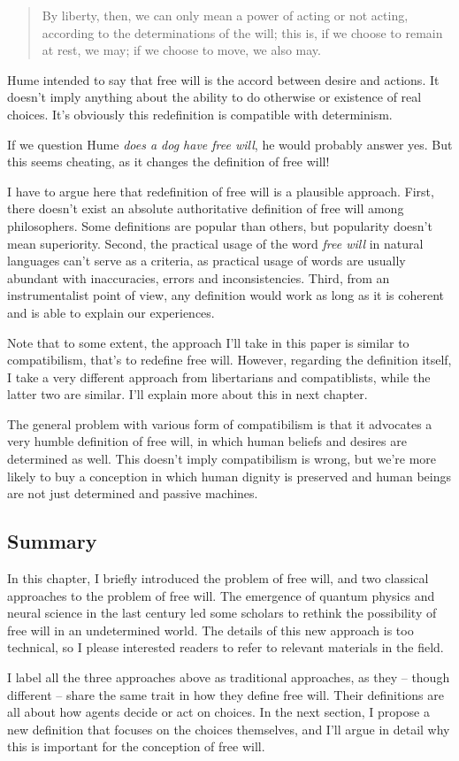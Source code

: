 \begin{quote}
By liberty, then, we can only mean a power of acting or not acting, according to the determinations of the will; this is, if we choose to remain at rest, we may; if we choose to move, we also may.
\end{quote}

Hume intended to say that free will is the accord between desire and actions. It doesn't imply anything about the ability to do otherwise or existence of real choices. It's obviously this redefinition is compatible with determinism.

If we question Hume \emph{does a dog have free will}, he would probably answer yes. But this seems cheating, as it changes the definition of free will!

I have to argue here that redefinition of free will is a plausible approach. First, there doesn't exist an absolute authoritative definition of free will among philosophers. Some definitions are popular than others, but popularity doesn't mean superiority. Second, the practical usage of the word \emph{free will} in natural languages can't serve as a criteria, as practical usage of words are usually abundant with inaccuracies,  errors and inconsistencies. Third, from an instrumentalist point of view, any definition would work as long as it is coherent and is able to explain our experiences.

Note that to some extent, the approach I'll take in this paper is similar to compatibilism, that's to redefine free will. However, regarding the definition itself, I take a very different approach from libertarians and compatiblists, while the latter two are similar. I'll explain more about this in next chapter.

The general problem with various form of compatibilism is that it advocates a very humble definition of free will, in which human beliefs and desires are determined as well. This doesn't imply compatibilism is wrong, but we're more likely to buy a conception in which human dignity is preserved and human beings are not just determined and passive machines.

\subsection{Summary}

In this chapter, I briefly introduced the problem of free will, and two classical approaches to the problem of free will. The emergence of quantum physics and neural science in the last century led some scholars to rethink the possibility of free will in an undetermined world. The details of this new approach is too technical, so I please interested readers to refer to relevant materials in the field.

I label all the three approaches above as traditional approaches, as they -- though different -- share the same trait in how they define free will. Their definitions are all about how agents decide or act on choices. In the next section, I propose a new definition that focuses on the choices themselves, and I'll argue in detail why this is important for the conception of free will.
